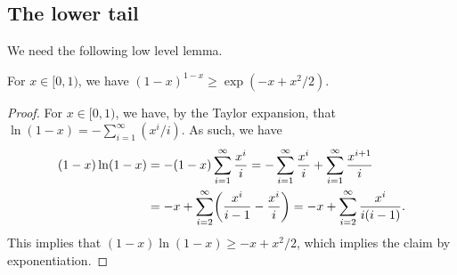 

\subsection{The lower tail}

We need the following low level lemma.
\begin{lemma}
    For $x \in [0,1)$, we have $(1-x)^{1-x} \geq \exp( -x + x^2/2)$.
\end{lemma}
\begin{proof}
    For $x \in [0,1)$, we have, by the Taylor expansion, that
    $\ln (1-x) = - \sum_{i=1}^\infty ({x^i}/{i})$. As such, we have
    \begin{align*}
        (1-x)\ln(1-x) %
        &=%
        - (1-x) \sum_{i=1}^\infty \frac{x^i}{i}
        =%
        -  \sum_{i=1}^\infty \frac{x^i}{i}
        +  \sum_{i=1}^\infty \frac{x^{i+1}}{i}
        \\&=%
        -x + \sum_{i=2}^\infty \pth{\frac{x^i}{i-1} -\frac{x^i}{i}}%
        =%
        -x + \sum_{i=2}^\infty \frac{x^i}{i(i-1)}.
    \end{align*}
    This implies that $(1-x)\ln(1-x) \geq -x + x^2/2$, which implies
    the claim by exponentiation.
\end{proof}

